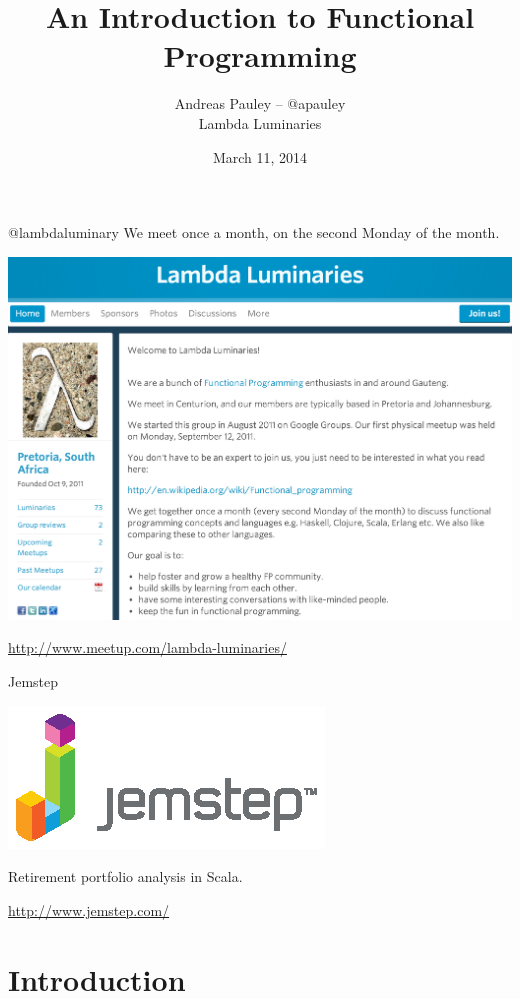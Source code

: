 \documentclass[mathserif]{beamer}
\title[Functional Programming]{An Introduction to Functional Programming}
\author{Andreas Pauley -- @apauley \\ Lambda Luminaries}
\institute{\href{http://www.meetup.com/DeveloperUG/events/139983502/}{DeveloperUG}}
\date{March 11, 2014}
\begin{document}
\begin{frame}
  \titlepage
\end{frame}

\begin{frame}{@lambdaluminary}
  We meet once a month, on the second Monday of the month.
  \begin{center}
    \includegraphics[scale=0.2]{img/ScreenShotLambdaLuminaries.png}
  \end{center}
  \url{http://www.meetup.com/lambda-luminaries/}
\end{frame}

\begin{frame}{Jemstep}
  \begin{center}
    \includegraphics[scale=2]{img/Jemstep_HD_RGB.eps}
  \end{center}

  Retirement portfolio analysis in Scala.

  \vskip5mm

  \url{http://www.jemstep.com/}
\end{frame}

\section{Introduction}
\end{document}

